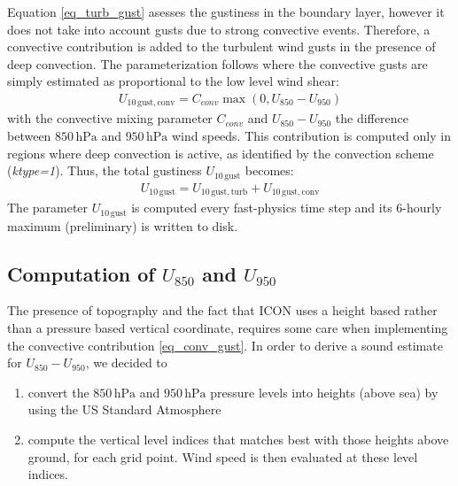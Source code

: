 \documentclass[a4paper,11pt]{article}
\begin{document}
Equation \eqref{eq_turb_gust} asesses the gustiness in the boundary layer, however it does not take into account gusts due to strong convective events. Therefore, a 
convective contribution is added to the turbulent wind gusts in the presence of deep convection. The parameterization follows \cite{Bechthold:2009} where the convective gusts 
are simply estimated as proportional to the low level wind shear:
\begin{align}
U_{10\,\mathrm{gust, conv}} = C_{conv} \max{(0,U_{850} - U_{950})} \label{eq_conv_gust}
\end{align}
with the convective mixing parameter $C_{conv}$ and $U_{850} - U_{950}$ the difference between $850\,\mathrm{hPa}$ and $950\,\mathrm{hPa}$ wind speeds. This contribution 
is computed only in regions where deep convection is active, as identified by the convection scheme (\emph{ktype=1}). Thus, the total gustiness 
$U_{10\,\mathrm{gust}}$ becomes:
\begin{align}
  U_{10\,\mathrm{gust}} = U_{10\,\mathrm{gust, turb}} + U_{10\,\mathrm{gust, conv}}
\end{align}
The parameter $U_{10\,\mathrm{gust}}$ is computed every fast-physics time step and its 6-hourly maximum (preliminary) is written to disk.


\subsection{Computation of $U_{850}$ and $U_{950}$}

The presence of topography and the fact that ICON uses a height based rather than a pressure based vertical coordinate, requires some care when implementing the convective 
contribution \eqref{eq_conv_gust}. In order to derive a sound estimate for $U_{850} - U_{950}$, we decided to
\begin{enumerate}
 \item convert the $850\,\mathrm{hPa}$ and $950\,\mathrm{hPa}$ pressure levels into heights (above sea) by using the US Standard Atmosphere
 \item compute the vertical level indices that matches best with those heights above ground, for each grid point. Wind speed is then evaluated at these level indices.
\end{enumerate}
\end{document}
